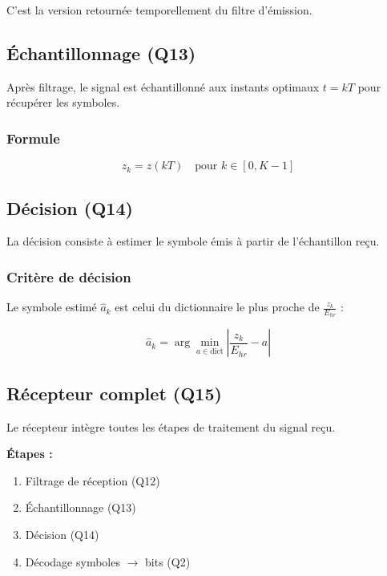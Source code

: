 \documentclass[12pt,a4paper]{article}
\begin{document}
C'est la version retournée temporellement du filtre d'émission.

\subsection{Échantillonnage (Q13)}

Après filtrage, le signal est échantillonné aux instants optimaux $t = kT$ pour récupérer les symboles.

\subsubsection{Formule}

\begin{equation}
    z_k = z(kT) \quad \text{pour } k \in [0, K-1]
\end{equation}

\subsection{Décision (Q14)}

La décision consiste à estimer le symbole émis à partir de l'échantillon reçu.

\subsubsection{Critère de décision}

Le symbole estimé $\hat{a}_k$ est celui du dictionnaire le plus proche de $\frac{z_k}{E_{hr}}$ :

\begin{equation}
    \hat{a}_k = \arg\min_{a \in \text{dict}} \left| \frac{z_k}{E_{hr}} - a \right|
\end{equation}

\subsection{Récepteur complet (Q15)}

Le récepteur intègre toutes les étapes de traitement du signal reçu.

\textbf{Étapes :}
\begin{enumerate}
    \item Filtrage de réception (Q12)
    \item Échantillonnage (Q13)
    \item Décision (Q14)
    \item Décodage symboles $\rightarrow$ bits (Q2)
\end{enumerate}
\end{document}
